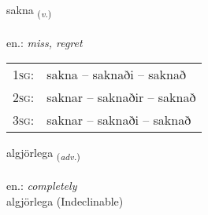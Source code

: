 \documentclass[frontgrid, backgrid]{flacards}\usepackage[]{graphicx}\usepackage[]{xcolor}
\begin{document}
\renewcommand{\flhead}{\vskip5pt \fboxsep=0pt {\small\bfseries\footnotesize Sagnorð | Verb}}
\renewcommand{\fcfoot}{\vskip5pt \fboxsep=0pt \hspace{2pt}{\small\bfseries\footnotesize 2K}}

\renewcommand{\blhead}{\vskip5pt {\small\bfseries\footnotesize Sagnorð | Verb }}
\renewcommand{\bcfoot}{\vskip5pt \hspace{2pt}{\small\bfseries\footnotesize 2K}}


{sakna \small{\textsubscript{(\textit{v.})}} \\[1ex] %
\textphonetic{[sahkna]} \\
en.: \emph{miss, regret} \\  [2ex]
\renewcommand*{\arraystretch}{0.8}
\begin{tabular}{p{1cm}l}
\textsc{1sg}: & sakna -- saknaði -- saknað \\ 
\textsc{2sg}: & saknar -- saknaðir -- saknað \\ 
\textsc{3sg}: & saknar -- saknaði -- saknað \\ 
\end{tabular}
}


\renewcommand{\flhead}{\vskip5pt \fboxsep=0pt {\small\bfseries\footnotesize Atviksorð | Adverb}}
\renewcommand{\fcfoot}{\vskip5pt \fboxsep=0pt \hspace{2pt}{\small\bfseries\footnotesize 2K}}

\renewcommand{\blhead}{\vskip5pt {\small\bfseries\footnotesize Atviksorð | Adverb }}
\renewcommand{\bcfoot}{\vskip5pt \hspace{2pt}{\small\bfseries\footnotesize 2K}}


{algjörlega \small{\textsubscript{(\textit{adv.})}} \\[1ex]
\textphonetic{[alcœrlɛɣa]} \\
en.: \emph{completely} \\  [2ex]
algjörlega (Indeclinable)}

\renewcommand{\flhead}{\vskip5pt \fboxsep=0pt {\small\bfseries\footnotesize Nafnorð | Noun}}
\renewcommand{\fcfoot}{\vskip5pt \fboxsep=0pt \hspace{2pt}{\small\bfseries\footnotesize 2K}}
\end{document}
